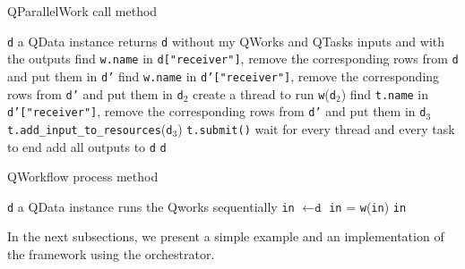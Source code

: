 \documentclass[10pt, conference, compsocconf]{IEEEtran}
\begin{document}
\begin{algorithm}
\caption{QParallelWork call method}
\label{alg:Qparallel}
\begin{algorithmic}
\REQUIRE \texttt{d} a QData instance
\ENSURE returns \texttt{d} without my QWorks and QTasks inputs and with the outputs
\STATE find \texttt{w.name} in \texttt{d["receiver"]}, remove the corresponding rows from \texttt{d} and put them in \texttt{d'}
\ENDFOR
{}
\STATE find \texttt{w.name} in \texttt{d'["receiver"]}, remove the corresponding rows from \texttt{d'} and put them in \texttt{d$_2$}
\STATE create a thread to run \texttt{w}(\texttt{d$_2$})
\ENDFOR
{}
\STATE find \texttt{t.name} in \texttt{d'["receiver"]}, remove the corresponding rows from \texttt{d'} and put them in \texttt{d$_3$}
\STATE \texttt{t.add\_input\_to\_resources}(\texttt{d$_3$})
\STATE \texttt{t.submit()}
\ENDFOR
\STATE wait for every thread and every task to end
\STATE add all outputs to \texttt{d}
\RETURN \texttt{d}
\end{algorithmic}
\end{algorithm}

\begin{algorithm}
\caption{QWorkflow process method}
\label{alg:Qworkflow}
\begin{algorithmic}
\REQUIRE \texttt{d} a QData instance
\ENSURE runs the Qworks sequentially
\STATE \texttt{in} $\leftarrow \texttt{d}$
\STATE \texttt{in} = \texttt{w}(\texttt{in})
\ENDFOR
\RETURN \texttt{in}
\end{algorithmic}
\end{algorithm}

In the next subsections, we present a simple example and an implementation of the framework using the orchestrator.
 
\end{document}

